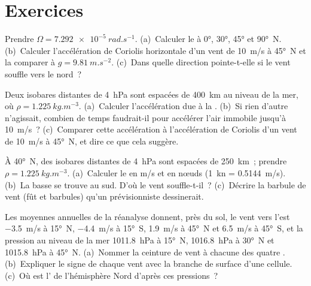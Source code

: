 \section{Exercices}

\begin{exercise}[$\star$]\label{exo:b1:atmospheric-circulation:1}
Prendre $\Omega = \qty{7.292e-5}{rad.s^{-1}}$. (a)~Calculer le  à
\ang{0}, \ang{30}, \ang{45} et \ang{90}~N. (b)~Calculer l'accélération de Coriolis
horizontale d'un vent de \qty{10}{m/s} à \ang{45}~N et la comparer à $g =
\qty{9.81}{m.s^{-2}}$. (c)~Dans quelle direction pointe-t-elle si le vent souffle
vers le nord~?
\end{exercise}

\begin{exercise}[$\star$]\label{exo:b1:atmospheric-circulation:2}
Deux isobares distantes de \qty{4}{hPa} sont espacées de \qty{400}{km} au niveau de la mer, où $\rho =
\qty{1.225}{kg.m^{-3}}$. (a)~Calculer l'accélération due à la . (b)~Si rien d'autre n'agissait, combien de temps faudrait-il pour accélérer l'air immobile jusqu'à
\qty{10}{m/s}~? (c)~Comparer cette accélération à l'accélération de Coriolis d'un vent
de \qty{10}{m/s} à \ang{45}~N, et dire ce que cela suggère.
\end{exercise}

\begin{exercise}[$\star$]\label{exo:b1:atmospheric-circulation:3}
À \ang{40}~N, des isobares distantes de \qty{4}{hPa} sont espacées de \qty{250}{km}~; prendre $\rho =
\qty{1.225}{kg.m^{-3}}$. (a)~Calculer le  en \unit{m/s} et en nœuds
(\qty{1}{kn} = \qty{0.5144}{m/s}). (b)~La basse se trouve au sud. D'où
le vent souffle-t-il~? (c)~Décrire la barbule de vent (fût et barbules) qu'un
prévisionniste dessinerait.
\end{exercise}

\begin{exercise}[$\star$]\label{exo:b1:atmospheric-circulation:4}
Les moyennes annuelles de la réanalyse donnent, près du sol, le vent vers l'est
\qty{-3.5}{m/s} à \ang{15}~N, \qty{-4.4}{m/s} à \ang{15}~S, \qty{+1.9}{m/s} à
\ang{45}~N et \qty{+6.5}{m/s} à \ang{45}~S, et la pression au niveau de la mer
\qty{1011.8}{hPa} à \ang{15}~N, \qty{1016.8}{hPa} à \ang{30}~N et
\qty{1015.8}{hPa} à \ang{45}~N. (a)~Nommer la ceinture de vent à chacune des quatre .
(b)~Expliquer le signe de chaque vent avec la branche de surface d'une cellule. (c)~Où est
l' de l'hémisphère Nord d'après ces pressions~?
\end{exercise}

